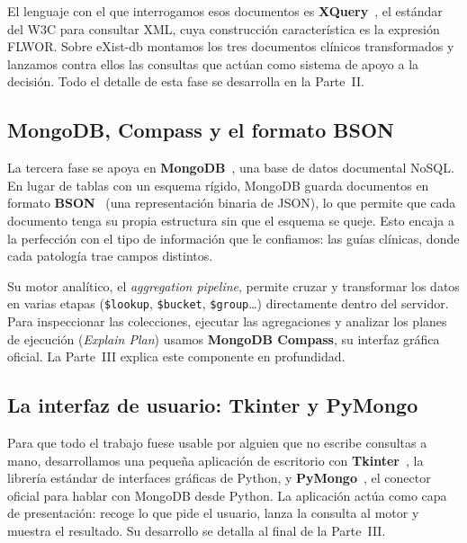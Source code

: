 \documentclass[../main.tex]{subfiles}
\begin{document}
El lenguaje con el que interrogamos esos documentos es \textbf{XQuery}~\cite{w3cxquery}, el estándar del W3C para consultar XML, cuya construcción característica es la expresión FLWOR. Sobre eXist-db montamos los tres documentos clínicos transformados y lanzamos contra ellos las consultas que actúan como sistema de apoyo a la decisión. Todo el detalle de esta fase se desarrolla en la Parte~II.

\subsection{MongoDB, Compass y el formato BSON}

La tercera fase se apoya en \textbf{MongoDB}~\cite{mongodbmanual}, una base de datos documental NoSQL. En lugar de tablas con un esquema rígido, MongoDB guarda documentos en formato \textbf{BSON}~\cite{bsonspec} (una representación binaria de JSON), lo que permite que cada documento tenga su propia estructura sin que el esquema se queje. Esto encaja a la perfección con el tipo de información que le confiamos: las guías clínicas, donde cada patología trae campos distintos.

Su motor analítico, el \textit{aggregation pipeline}, permite cruzar y transformar los datos en varias etapas (\texttt{\$lookup}, \texttt{\$bucket}, \texttt{\$group}\ldots) directamente dentro del servidor. Para inspeccionar las colecciones, ejecutar las agregaciones y analizar los planes de ejecución (\textit{Explain Plan}) usamos \textbf{MongoDB Compass}, su interfaz gráfica oficial. La Parte~III explica este componente en profundidad.

\subsection{La interfaz de usuario: Tkinter y PyMongo}

Para que todo el trabajo fuese usable por alguien que no escribe consultas a mano, desarrollamos una pequeña aplicación de escritorio con \textbf{Tkinter}~\cite{tkinter}, la librería estándar de interfaces gráficas de Python, y \textbf{PyMongo}~\cite{pymongo}, el conector oficial para hablar con MongoDB desde Python. La aplicación actúa como capa de presentación: recoge lo que pide el usuario, lanza la consulta al motor y muestra el resultado. Su desarrollo se detalla al final de la Parte~III.
\end{document}
